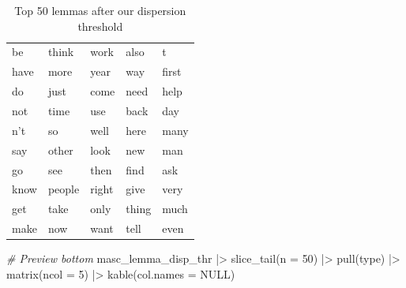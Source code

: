 \documentclass[
  letterpaper,
  krantz1]{latex/krantz-mod}
\newenvironment{Shaded}{\begin{snugshade}}{\end{snugshade}}
\newcommand{\AttributeTok}[1]{\textcolor[rgb]{0.00,0.00,0.00}{#1}}
\newcommand{\CommentTok}[1]{\textcolor[rgb]{0.00,0.00,0.00}{\textit{#1}}}
\newcommand{\ConstantTok}[1]{\textcolor[rgb]{0.00,0.00,0.00}{#1}}
\newcommand{\DecValTok}[1]{\textcolor[rgb]{0.00,0.00,0.00}{#1}}
\newcommand{\FunctionTok}[1]{\textcolor[rgb]{0.00,0.00,0.00}{#1}}
\newcommand{\NormalTok}[1]{\textcolor[rgb]{0.00,0.00,0.00}{#1}}
\newcommand{\SpecialCharTok}[1]{\textcolor[rgb]{0.00,0.00,0.00}{#1}}
\theoremstyle{definition}
\theoremstyle{definition}
\theoremstyle{remark}
\begin{document}
\begin{longtable}[]{@{}
  >{\raggedright\arraybackslash}p{}
  >{\raggedright\arraybackslash}p{}
  >{\raggedright\arraybackslash}p{}
  >{\raggedright\arraybackslash}p{}
  >{\raggedright\arraybackslash}p{}@{}}

\caption{\label{tbl-explore-masc-dp-filter-preview-top}Top 50 lemmas
after our dispersion threshold}

\tabularnewline

\toprule\noalign{}
\endhead
\bottomrule\noalign{}
\endlastfoot
be & think & work & also & t \\
have & more & year & way & first \\
do & just & come & need & help \\
not & time & use & back & day \\
n't & so & well & here & many \\
say & other & look & new & man \\
go & see & then & find & ask \\
know & people & right & give & very \\
get & take & only & thing & much \\
make & now & want & tell & even \\

\end{longtable}

\begin{Shaded}
\begin{Highlighting}[numbers=left,,]
\CommentTok{\# Preview bottom}
\NormalTok{masc\_lemma\_disp\_thr }\SpecialCharTok{|\textgreater{}}
  \FunctionTok{slice\_tail}\NormalTok{(}\AttributeTok{n =} \DecValTok{50}\NormalTok{) }\SpecialCharTok{|\textgreater{}}
  \FunctionTok{pull}\NormalTok{(type) }\SpecialCharTok{|\textgreater{}}
  \FunctionTok{matrix}\NormalTok{(}\AttributeTok{ncol =} \DecValTok{5}\NormalTok{) }\SpecialCharTok{|\textgreater{}}
  \FunctionTok{kable}\NormalTok{(}\AttributeTok{col.names =} \ConstantTok{NULL}\NormalTok{)}
\end{Highlighting}
\end{Shaded}
\end{document}
